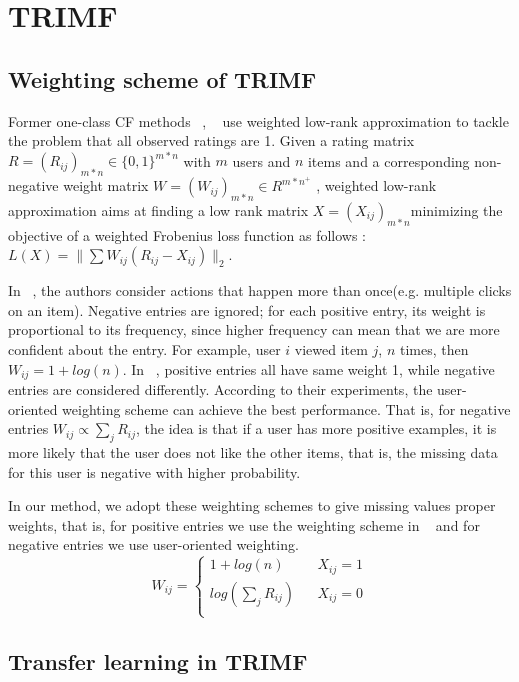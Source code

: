 \section{TRIMF}
\subsection{Weighting scheme of TRIMF}
  \par{Former one-class CF methods ~\cite{4781121}, ~\cite{4781145} use weighted low-rank approximation to tackle the problem that all observed ratings are 1. Given a rating matrix $R = (R_{ij})_{m*n} \in \{0, 1\}^{m*n}$ with $m$ users and $n$ items and a corresponding non-negative weight matrix $W = (W_{ij})_{m*n} \in R^{m*n^+}$ , weighted low-rank approximation aims at finding a low rank matrix $X = (X_{ij})_{m*n} $minimizing the objective of a weighted Frobenius loss function as follows : $L(X) = \|\sum W_{ij}(R_{ij} - X_{ij})\|_2$. 

In ~\cite{4781121}, the authors consider actions that happen more than once(e.g. multiple clicks on an item). Negative entries are ignored; for each positive entry, its weight is proportional to its frequency, since higher frequency can mean that we are more confident about the entry. For example, user $i$ viewed item $j$, $n$ times, then $W_{ij} = 1 + log(n)$. In ~\cite{4781145}, positive entries all have same weight 1, while negative entries are considered differently. According to their experiments, the user-oriented weighting scheme can achieve the best performance. That is, for negative entries $W_{ij} \propto \sum_j{R_{ij}}$, the idea is that if a user has more positive examples, it is more likely that the user does not like the other items, that is, the missing data for this user is negative with higher probability.

In our method, we adopt these weighting schemes to give missing values proper weights, that is, for positive entries we use the weighting scheme in ~\cite{4781121} and for negative entries we use user-oriented weighting. $$ W_{ij}=\left\{
\begin{aligned}
1 + log(n) & & X_{ij} = 1\\
log(\sum_j{R_{ij}}) &  & X_{ij} = 0 \\
\end{aligned}
\right.
$$}
\subsection{Transfer learning in TRIMF}

